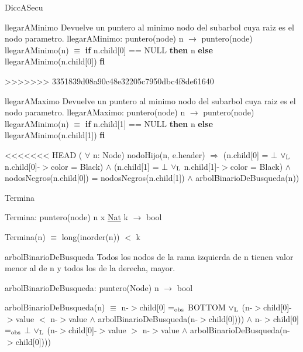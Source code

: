 \begin{DoxyParagraph}{\-Dicc\-A\-Secu}
\begin{DoxyParagraph}{llegar\+A\+Minimo}
Devuelve un puntero al minimo nodo del subarbol cuya raiz es el nodo parametro. llegar\+A\+Minimo\+: puntero(node) n $\to$ puntero(node)~\newline
llegar\+A\+Minimo(n) $\equiv$ {\bfseries if} n.\+child\mbox{[}0\mbox{]} == N\+U\+LL {\bfseries then} n {\bfseries else} llegar\+A\+Minimo(n.\+child\mbox{[}0\mbox{]}) {\bfseries fi} 
\end{DoxyParagraph}
>>>>>>> 3351839d08a90c48e32205c7950dbc4f8de61640


\begin{DoxyParagraph}{llegar\+A\+Maximo}
Devuelve un puntero al minimo nodo del subarbol cuya raiz es el nodo parametro. llegar\+A\+Maximo\+: puntero(node) n $\to$ puntero(node)~\newline
llegar\+A\+Minimo(n) $\equiv$ {\bfseries if} n.\+child\mbox{[}1\mbox{]} == N\+U\+LL {\bfseries then} n {\bfseries else} llegar\+A\+Minimo(n.\+child\mbox{[}1\mbox{]}) {\bfseries fi} 
\end{DoxyParagraph}
<<<<<<< HEAD
( $\forall$ n\-: \-Node) nodo\-Hijo(n, e.\-header) $\Rightarrow$ (n.\-child\mbox{[}0\mbox{]} = $\bot$ $\lor_{\rm L}$ n.\-child\mbox{[}0\mbox{]}-\/$>$color = \-Black) $\land$ (n.\-child\mbox{[}1\mbox{]} = $\bot$ $\lor_{\rm L}$ n.\-child\mbox{[}1\mbox{]}-\/$>$color = \-Black) $\land$ nodos\-Negros(n.\-child\mbox{[}0\mbox{]}) = nodos\-Negros(n.\-child\mbox{[}1\mbox{]}) $\land$ arbol\-Binario\-De\-Busqueda(n)) 

\begin{DoxyParagraph}{\-Termina}

\end{DoxyParagraph}
\-Termina\-: puntero(node) n x \hyperlink{classNat}{\-Nat} k $\to$ bool\par
 \-Termina(n) $\equiv$ long(inorder(n)) $<$ k 

\begin{DoxyParagraph}{arbol\-Binario\-De\-Busqueda}
\-Todos los nodos de la rama izquierda de n tienen valor menor al de n y todos los de la derecha, mayor.
\end{DoxyParagraph}
arbol\-Binario\-De\-Busqueda\-: puntero(\-Node) n $\to$ bool\par
 arbol\-Binario\-De\-Busqueda(n) $\equiv$ n-\/$>$child\mbox{[}0\mbox{]} $=_{\rm obs}$ \-B\-O\-T\-T\-O\-M $\lor_{\rm L}$ (n-\/$>$child\mbox{[}0\mbox{]}-\/$>$value $<$ n-\/$>$value $\land$ arbol\-Binario\-De\-Busqueda(n-\/$>$child\mbox{[}0\mbox{]}))) $\land$ n-\/$>$child\mbox{[}0\mbox{]} $=_{\rm obs}$ $\bot$ $\lor_{\rm L}$ (n-\/$>$child\mbox{[}0\mbox{]}-\/$>$value $>$ n-\/$>$value $\land$ arbol\-Binario\-De\-Busqueda(n-\/$>$child\mbox{[}0\mbox{]}))) 


\end{DoxyParagraph}
